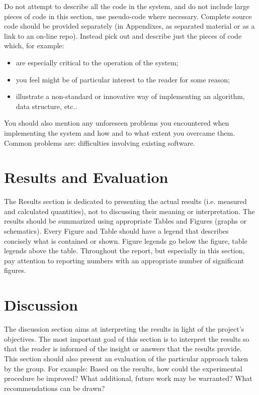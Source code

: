 Do not attempt to describe all the code in the system, and do not include large pieces of code in this section, use pseudo-code where necessary. Complete source code should be provided separately (in Appendixes, as separated material or as a link to an on-line repo). Instead pick out and describe just the pieces of code which, for example:
\begin{itemize}
\item are especially critical to the operation of the system;
\item you feel might be of particular interest to the reader for some reason;
\item  illustrate a non-standard or innovative way of implementing an algorithm, data
structure, etc..
\end{itemize}

You should also mention any unforeseen problems you encountered when implementing the
system and how and to what extent you overcame them. Common problems are:
 difficulties involving existing software.


\section{Results and Evaluation}
The Results section is dedicated to presenting the actual results (i.e. measured and calculated quantities), not to discussing their meaning or interpretation. The results should be summarized using appropriate Tables and Figures (graphs or schematics). Every Figure and Table should have a legend that describes concisely what is contained or shown. Figure legends go below the figure, table legends above the table. Throughout the report, but especially in this section, pay attention to reporting numbers with an appropriate number of significant figures. 

\section{Discussion}
The discussion section aims at interpreting the results in light of the project's objectives. The most important goal of this section is to interpret the results so that the reader is informed of the insight or answers that the results provide. This section should also present an evaluation of the particular approach taken by the group. For example: Based on the results, how could the experimental procedure be improved? What additional, future work may be warranted? What recommendations can be drawn?


